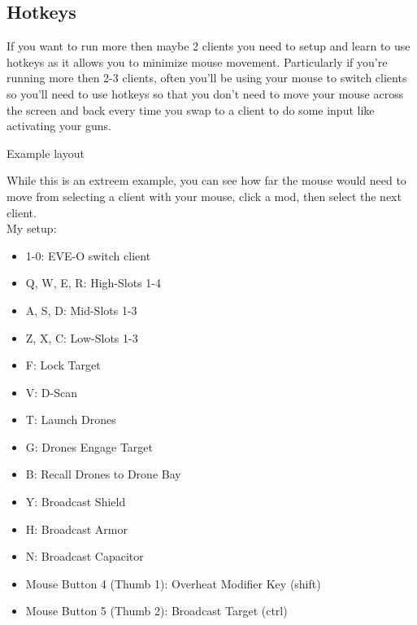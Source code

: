 \documentclass{article}
\begin{document}
\clearpage
\subsection{Hotkeys}

If you want to run more then maybe 2 clients you need to setup and learn to use hotkeys as it allows you
to minimize mouse movement. Particularly if you're running more then 2-3 clients, often you'll be using your
mouse to switch clients so you'll need to use hotkeys so that you don't need to move your mouse across the
screen and back every time you swap to a client to do some input like activating your guns.
\\
\begin{center}
Example layout
\end{center}
While this is an extreem example, you can see how far the mouse would need to move from selecting a client with your mouse,
click a mod, then select the next client. \\

\noindent My setup: \\

\begin{itemize}
  \item 1-0: EVE-O switch client
  \item Q, W, E, R: High-Slots 1-4
  \item A, S, D: Mid-Slots 1-3
  \item Z, X, C: Low-Slots 1-3
  \item F: Lock Target\
  \item V: D-Scan
  \item T: Launch Drones
  \item G: Drones Engage Target
  \item B: Recall Drones to Drone Bay
  \item Y: Broadcast Shield
  \item H: Broadcast Armor
  \item N: Broadcast Capacitor
  \item Mouse Button 4 (Thumb 1): Overheat Modifier Key (shift)
  \item Mouse Button 5 (Thumb 2): Broadcast Target (ctrl)
\end{itemize}
\end{document}
